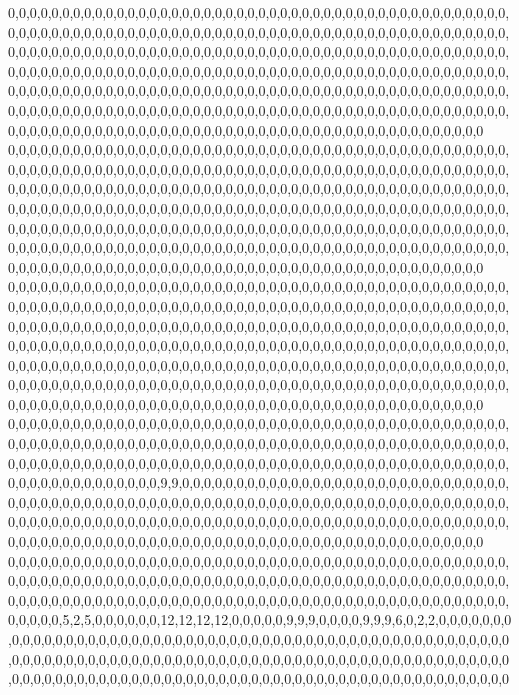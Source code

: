 0,0,0,0,0,0,0,0,0,0,0,0,0,0,0,0,0,0,0,0,0,0,0,0,0,0,0,0,0,0,0,0,0,0,0,0,0,0,0,0,0,0,0,0,0,0,0,0,0,0,0,0,0,0,0,0,0,0,0,0,0,0,0,0,0,0,0,0,0,0,0,0,0,0,0,0,0,0,0,0,0,0,0,0,0,0,0,0,0,0,0,0,0,0,0,0,0,0,0,0,0,0,0,0,0,0,0,0,0,0,0,0,0,0,0,0,0,0,0,0,0,0,0,0,0,0,0,0,0,0,0,0,0,0,0,0,0,0,0,0,0,0,0,0,0,0,0,0,0,0,0,0,0,0,0,0,0,0,0,0,0,0,0,0,0,0,0,0,0,0,0,0,0,0,0,0,0,0,0,0,0,0,0,0,0,0,0,0,0,0,0,0,0,0,0,0,0,0,0,0,0,0,0,0,0,0,0,0,0,0,0,0,0,0,0,0,0,0,0,0,0,0,0,0,0,0,0,0,0,0,0,0,0,0,0,0,0,0,0,0,0,0,0,0,0,0,0,0,0,0,0,0,0,0,0,0,0,0,0,0,0,0,0,0,0,0,0,0,0,0,0,0,0,0,0,0,0,0,0,0,0,0,0,0,0,0,0,0,0,0,0,0,0,0,0,0,0,0,0,0,0,0,0,0,0,0,0,0,0,0,0,0,0,0,0,0,0,0,0,0
0,0,0,0,0,0,0,0,0,0,0,0,0,0,0,0,0,0,0,0,0,0,0,0,0,0,0,0,0,0,0,0,0,0,0,0,0,0,0,0,0,0,0,0,0,0,0,0,0,0,0,0,0,0,0,0,0,0,0,0,0,0,0,0,0,0,0,0,0,0,0,0,0,0,0,0,0,0,0,0,0,0,0,0,0,0,0,0,0,0,0,0,0,0,0,0,0,0,0,0,0,0,0,0,0,0,0,0,0,0,0,0,0,0,0,0,0,0,0,0,0,0,0,0,0,0,0,0,0,0,0,0,0,0,0,0,0,0,0,0,0,0,0,0,0,0,0,0,0,0,0,0,0,0,0,0,0,0,0,0,0,0,0,0,0,0,0,0,0,0,0,0,0,0,0,0,0,0,0,0,0,0,0,0,0,0,0,0,0,0,0,0,0,0,0,0,0,0,0,0,0,0,0,0,0,0,0,0,0,0,0,0,0,0,0,0,0,0,0,0,0,0,0,0,0,0,0,0,0,0,0,0,0,0,0,0,0,0,0,0,0,0,0,0,0,0,0,0,0,0,0,0,0,0,0,0,0,0,0,0,0,0,0,0,0,0,0,0,0,0,0,0,0,0,0,0,0,0,0,0,0,0,0,0,0,0,0,0,0,0,0,0,0,0,0,0,0,0,0,0,0,0,0,0,0,0,0,0,0,0,0,0,0,0,0,0,0,0,0,0
0,0,0,0,0,0,0,0,0,0,0,0,0,0,0,0,0,0,0,0,0,0,0,0,0,0,0,0,0,0,0,0,0,0,0,0,0,0,0,0,0,0,0,0,0,0,0,0,0,0,0,0,0,0,0,0,0,0,0,0,0,0,0,0,0,0,0,0,0,0,0,0,0,0,0,0,0,0,0,0,0,0,0,0,0,0,0,0,0,0,0,0,0,0,0,0,0,0,0,0,0,0,0,0,0,0,0,0,0,0,0,0,0,0,0,0,0,0,0,0,0,0,0,0,0,0,0,0,0,0,0,0,0,0,0,0,0,0,0,0,0,0,0,0,0,0,0,0,0,0,0,0,0,0,0,0,0,0,0,0,0,0,0,0,0,0,0,0,0,0,0,0,0,0,0,0,0,0,0,0,0,0,0,0,0,0,0,0,0,0,0,0,0,0,0,0,0,0,0,0,0,0,0,0,0,0,0,0,0,0,0,0,0,0,0,0,0,0,0,0,0,0,0,0,0,0,0,0,0,0,0,0,0,0,0,0,0,0,0,0,0,0,0,0,0,0,0,0,0,0,0,0,0,0,0,0,0,0,0,0,0,0,0,0,0,0,0,0,0,0,0,0,0,0,0,0,0,0,0,0,0,0,0,0,0,0,0,0,0,0,0,0,0,0,0,0,0,0,0,0,0,0,0,0,0,0,0,0,0,0,0,0,0,0,0,0,0,0,0,0
0,0,0,0,0,0,0,0,0,0,0,0,0,0,0,0,0,0,0,0,0,0,0,0,0,0,0,0,0,0,0,0,0,0,0,0,0,0,0,0,0,0,0,0,0,0,0,0,0,0,0,0,0,0,0,0,0,0,0,0,0,0,0,0,0,0,0,0,0,0,0,0,0,0,0,0,0,0,0,0,0,0,0,0,0,0,0,0,0,0,0,0,0,0,0,0,0,0,0,0,0,0,0,0,0,0,0,0,0,0,0,0,0,0,0,0,0,0,0,0,0,0,0,0,0,0,0,0,0,0,0,0,0,0,0,0,0,0,0,0,0,0,0,0,0,0,0,0,0,0,0,0,9,9,0,0,0,0,0,0,0,0,0,0,0,0,0,0,0,0,0,0,0,0,0,0,0,0,0,0,0,0,0,0,0,0,0,0,0,0,0,0,0,0,0,0,0,0,0,0,0,0,0,0,0,0,0,0,0,0,0,0,0,0,0,0,0,0,0,0,0,0,0,0,0,0,0,0,0,0,0,0,0,0,0,0,0,0,0,0,0,0,0,0,0,0,0,0,0,0,0,0,0,0,0,0,0,0,0,0,0,0,0,0,0,0,0,0,0,0,0,0,0,0,0,0,0,0,0,0,0,0,0,0,0,0,0,0,0,0,0,0,0,0,0,0,0,0,0,0,0,0,0,0,0,0,0,0,0,0,0,0,0,0,0,0,0,0,0,0
0,0,0,0,0,0,0,0,0,0,0,0,0,0,0,0,0,0,0,0,0,0,0,0,0,0,0,0,0,0,0,0,0,0,0,0,0,0,0,0,0,0,0,0,0,0,0,0,0,0,0,0,0,0,0,0,0,0,0,0,0,0,0,0,0,0,0,0,0,0,0,0,0,0,0,0,0,0,0,0,0,0,0,0,0,0,0,0,0,0,0,0,0,0,0,0,0,0,0,0,0,0,0,0,0,0,0,0,0,0,0,0,0,0,0,0,0,0,0,0,0,0,0,0,0,0,0,0,0,0,0,0,0,0,0,0,0,0,0,0,0,0,0,5,2,5,0,0,0,0,0,0,12,12,12,12,0,0,0,0,0,9,9,9,0,0,0,0,9,9,9,6,0,2,2,0,0,0,0,0,0,0,0,0,0,0,0,0,0,0,0,0,0,0,0,0,0,0,0,0,0,0,0,0,0,0,0,0,0,0,0,0,0,0,0,0,0,0,0,0,0,0,0,0,0,0,0,0,0,0,0,0,0,0,0,0,0,0,0,0,0,0,0,0,0,0,0,0,0,0,0,0,0,0,0,0,0,0,0,0,0,0,0,0,0,0,0,0,0,0,0,0,0,0,0,0,0,0,0,0,0,0,0,0,0,0,0,0,0,0,0,0,0,0,0,0,0,0,0,0,0,0,0,0,0,0,0,0,0,0,0,0,0,0,0,0,0,0,0,0
